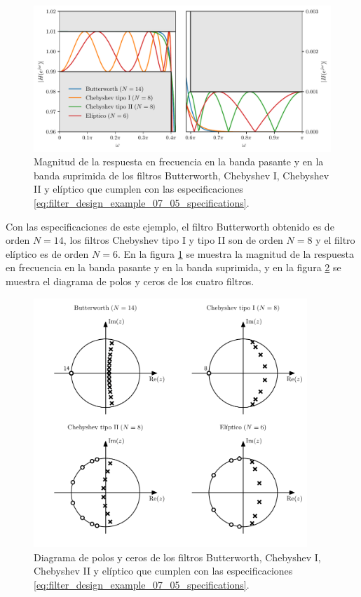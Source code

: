 \documentclass[a4paper]{report}
\begin{document}
\begin{figure}[!htb]
 \begin{center}
 \includegraphics[width=1\textwidth]{figuras/filter_design_example_07_05_specifications.pdf}
 \caption{\label{fig:filter_design_example_07_05_specifications} Magnitud de la respuesta en frecuencia en la banda pasante y en la banda suprimida de los filtros Butterworth, Chebyshev I, Chebyshev II y elíptico que cumplen con las especificaciones \ref{eq:filter_design_example_07_05_specifications}.}
 \end{center}
\end{figure}
Con las especificaciones de este ejemplo, el filtro Butterworth obtenido es de orden \(N=14\), los filtros Chebyshev tipo I y tipo II son de orden \(N=8\) y el filtro elíptico es de orden \(N=6\). En la figura \ref{fig:filter_design_example_07_05_specifications} se muestra la magnitud de la respuesta en frecuencia en la banda pasante y en la banda suprimida, y en la figura \ref{fig:filter_design_example_07_05_pole_zero} se muestra el diagrama de polos y ceros de los cuatro filtros.
 \begin{figure}[!htb]
 \begin{center}
 \includegraphics[width=0.92\textwidth]{figuras/filter_design_example_07_05_pole_zero.pdf}
 \caption{\label{fig:filter_design_example_07_05_pole_zero} Diagrama de polos y ceros de los filtros Butterworth, Chebyshev I, Chebyshev II y elíptico que cumplen con las especificaciones \ref{eq:filter_design_example_07_05_specifications}.}
 \end{center}
\end{figure} 
\end{document}
